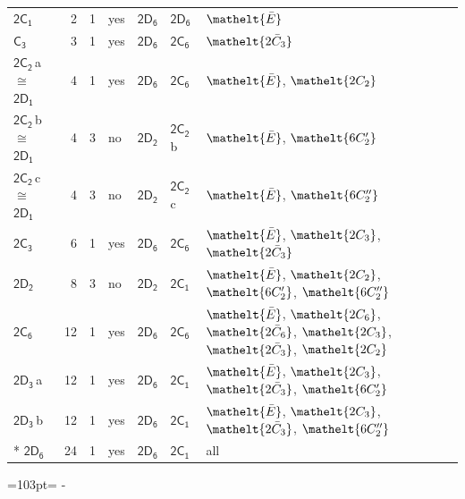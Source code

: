 \documentclass[10pt,a4paper]{article}
\newcommand{\needspace}[1]{\par\penalty-100\begingroup\dimen0=#1\relax\dimen2=\pagegoal
  \advance\dimen2-\pagetotal\ifdim\dimen0>\dimen2\relax\ifdim\dimen2>0pt\vfil\break\fi\fi
  \endgroup}
\numberwithin{equation}{section}
\newcommand{\eltfont}[1]{{\let\sigma\eltsigma\mathelt{#1}}}
\newcommand{\grp}[1]{\mathsf{#1}}
\newcommand{\cls}[1]{\eltfont{#1}}
\newcommand{\samecls}{\cong}
\newcommand{\clsletter}[1]{\,{\scriptsize\color{black!55}#1}}
\newcommand{\barred}[1]{\bar{#1}}
\newlength{\fillwidth}\newlength{\cellwidth}\newlength{\colwidth}
\begin{document}
{\begin{longtable}{@{}lrrlll>{\RaggedRight\arraybackslash}p{\fillwidth}@{}}
\href{2C1.pdf}{$\grp{2C_{1}}$} & 2 & 1 & yes & \href{2D6.pdf}{$\grp{2D_{6}}$} & \href{2D6.pdf}{$\grp{2D_{6}}$} & $\cls{\barred{E}}$\\
\href{C3.pdf}{$\grp{C_{3}}$} & 3 & 1 & yes & \href{2D6.pdf}{$\grp{2D_{6}}$} & \href{2C6.pdf}{$\grp{2C_{6}}$} & $\cls{2\barred{C}_{3}}$\\
\href{2C2.pdf}{$\grp{2C_{2}}$}\clsletter{a} $\samecls$ \href{2D1.pdf}{$\grp{2D_{1}}$} & 4 & 1 & yes & \href{2D6.pdf}{$\grp{2D_{6}}$} & \href{2C6.pdf}{$\grp{2C_{6}}$} & $\cls{\barred{E}}$, $\cls{2C_{2}}$\\
\href{2C2.pdf}{$\grp{2C_{2}}$}\clsletter{b} $\samecls$ \href{2D1.pdf}{$\grp{2D_{1}}$} & 4 & 3 & no & \href{2D2.pdf}{$\grp{2D_{2}}$} & \href{2C2.pdf}{$\grp{2C_{2}}$}\clsletter{b} & $\cls{\barred{E}}$, $\cls{6C_{2}'}$\\
\href{2C2.pdf}{$\grp{2C_{2}}$}\clsletter{c} $\samecls$ \href{2D1.pdf}{$\grp{2D_{1}}$} & 4 & 3 & no & \href{2D2.pdf}{$\grp{2D_{2}}$} & \href{2C2.pdf}{$\grp{2C_{2}}$}\clsletter{c} & $\cls{\barred{E}}$, $\cls{6C_{2}''}$\\
\href{2C3.pdf}{$\grp{2C_{3}}$} & 6 & 1 & yes & \href{2D6.pdf}{$\grp{2D_{6}}$} & \href{2C6.pdf}{$\grp{2C_{6}}$} & $\cls{\barred{E}}$, $\cls{2C_{3}}$, $\cls{2\barred{C}_{3}}$\\
\href{2D2.pdf}{$\grp{2D_{2}}$} & 8 & 3 & no & \href{2D2.pdf}{$\grp{2D_{2}}$} & \href{2C1.pdf}{$\grp{2C_{1}}$} & $\cls{\barred{E}}$, $\cls{2C_{2}}$, $\cls{6C_{2}'}$, $\cls{6C_{2}''}$\\
\href{2C6.pdf}{$\grp{2C_{6}}$} & 12 & 1 & yes & \href{2D6.pdf}{$\grp{2D_{6}}$} & \href{2C6.pdf}{$\grp{2C_{6}}$} & $\cls{\barred{E}}$, $\cls{2C_{6}}$, $\cls{2\barred{C}_{6}}$, $\cls{2C_{3}}$, $\cls{2\barred{C}_{3}}$, $\cls{2C_{2}}$\\
\href{2D3.pdf}{$\grp{2D_{3}}$}\clsletter{a} & 12 & 1 & yes & \href{2D6.pdf}{$\grp{2D_{6}}$} & \href{2C1.pdf}{$\grp{2C_{1}}$} & $\cls{\barred{E}}$, $\cls{2C_{3}}$, $\cls{2\barred{C}_{3}}$, $\cls{6C_{2}'}$\\
\href{2D3.pdf}{$\grp{2D_{3}}$}\clsletter{b} & 12 & 1 & yes & \href{2D6.pdf}{$\grp{2D_{6}}$} & \href{2C1.pdf}{$\grp{2C_{1}}$} & $\cls{\barred{E}}$, $\cls{2C_{3}}$, $\cls{2\barred{C}_{3}}$, $\cls{6C_{2}''}$\\*
\href{2D6.pdf}{$\grp{2D_{6}}$} & 24 & 1 & yes & \href{2D6.pdf}{$\grp{2D_{6}}$} & \href{2C1.pdf}{$\grp{2C_{1}}$} & all\\
\bottomrule\end{longtable}}
\needspace{103pt}
\end{document}
